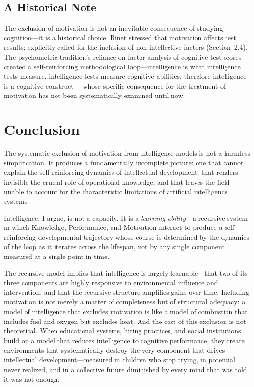 \documentclass[12pt,a4paper]{article}
\begin{document}
\subsection{A Historical Note}

The exclusion of motivation is not an inevitable consequence of studying cognition---\hspace{0pt}it is a historical choice. Binet stressed that motivation affects test results; \citet{Wechsler1940,Wechsler1943} explicitly called for the inclusion of non-intellective factors (Section~2.4). The psychometric tradition's reliance on factor analysis of cognitive test scores created a self-reinforcing methodological loop---\hspace{0pt}intelligence is what intelligence tests measure, intelligence tests measure cognitive abilities, therefore intelligence is a cognitive construct \citep{Sternberg1985}---\hspace{0pt}whose specific consequence for the treatment of motivation has not been systematically examined until now.


\section{Conclusion}

The systematic exclusion of motivation from intelligence models is not a harmless simplification. It produces a fundamentally incomplete picture: one that cannot explain the self-reinforcing dynamics of intellectual development, that renders invisible the crucial role of operational knowledge, and that leaves the field unable to account for the characteristic limitations of artificial intelligence systems.

Intelligence, I argue, is not a capacity. It is a \emph{learning ability}---\hspace{0pt}a recursive system in which Knowledge, Performance, and Motivation interact to produce a self-reinforcing developmental trajectory whose course is determined by the dynamics of the loop as it iterates across the lifespan, not by any single component measured at a single point in time.

The recursive model implies that intelligence is largely learnable---\hspace{0pt}that two of its three components are highly responsive to environmental influence and intervention, and that the recursive structure amplifies gains over time. Including motivation is not merely a matter of completeness but of structural adequacy: a model of intelligence that excludes motivation is like a model of combustion that includes fuel and oxygen but excludes heat. And the cost of this exclusion is not theoretical. When educational systems, hiring practices, and social institutions build on a model that reduces intelligence to cognitive performance, they create environments that systematically destroy the very component that drives intellectual development---\hspace{0pt}measured in children who stop trying, in potential never realized, and in a collective future diminished by every mind that was told it was not enough.
\end{document}
